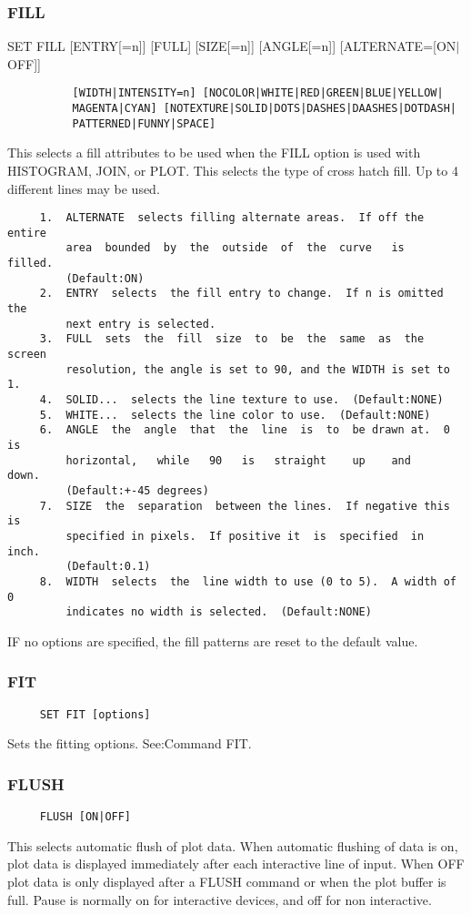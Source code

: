 \subsubsection{FILL}
SET FILL [ENTRY[=n]] [FULL] [SIZE[=n]] [ANGLE[=n]] [ALTERNATE=[ON$|$OFF]]
\begin{verbatim}
          [WIDTH|INTENSITY=n] [NOCOLOR|WHITE|RED|GREEN|BLUE|YELLOW|
          MAGENTA|CYAN] [NOTEXTURE|SOLID|DOTS|DASHES|DAASHES|DOTDASH|
          PATTERNED|FUNNY|SPACE] 
\end{verbatim}
This  selects a fill attributes to be used when the FILL option is used
with HISTOGRAM, JOIN, or PLOT.  This selects the type  of  cross  hatch
fill.  Up to 4 different lines may be used.  
\begin{verbatim}
     1.  ALTERNATE  selects filling alternate areas.  If off the entire
         area  bounded  by  the  outside  of  the  curve   is   filled.
         (Default:ON) 
     2.  ENTRY  selects  the fill entry to change.  If n is omitted the
         next entry is selected.  
     3.  FULL  sets  the  fill  size  to  be  the  same  as  the screen
         resolution, the angle is set to 90, and the WIDTH is set to 1. 
     4.  SOLID...  selects the line texture to use.  (Default:NONE) 
     5.  WHITE...  selects the line color to use.  (Default:NONE) 
     6.  ANGLE  the  angle  that  the  line  is  to  be drawn at.  0 is
         horizontal,   while   90   is   straight    up    and    down.
         (Default:+-45 degrees) 
     7.  SIZE  the  separation  between the lines.  If negative this is
         specified in pixels.  If positive it  is  specified  in  inch.
         (Default:0.1) 
     8.  WIDTH  selects  the  line width to use (0 to 5).  A width of 0
         indicates no width is selected.  (Default:NONE) 
\end{verbatim}
IF no options are specified, the fill patterns are reset to the default
value.  
\subsubsection{FIT}
\begin{verbatim}
     SET FIT [options] 
\end{verbatim}
Sets the fitting options.  
See:Command FIT.  
\subsubsection{FLUSH}
\begin{verbatim}
     FLUSH [ON|OFF] 
\end{verbatim}
This  selects automatic flush of plot data.  When automatic flushing of
data is on, plot data is displayed immediately after  each  interactive
line  of  input.   When  OFF  plot data is only displayed after a FLUSH
command or when the plot buffer is full.   Pause  is  normally  on  for
interactive devices, and off for non interactive.  
